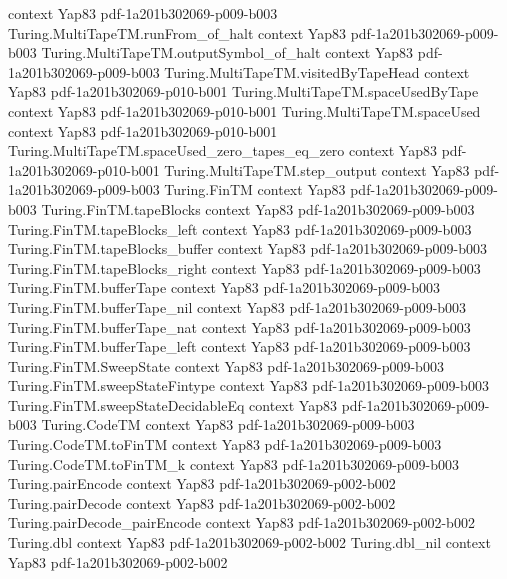 \begin{theorem}
  {context}
  {Yap83}
  {pdf-1a201b302069-p009-b003}
\proofstep
  {Turing.MultiTapeTM.runFrom_of_halt}
  {context}
  {Yap83}
  {pdf-1a201b302069-p009-b003}
\proofstep
  {Turing.MultiTapeTM.outputSymbol_of_halt}
  {context}
  {Yap83}
  {pdf-1a201b302069-p009-b003}
\proofstep
  {Turing.MultiTapeTM.visitedByTapeHead}
  {context}
  {Yap83}
  {pdf-1a201b302069-p010-b001}
\proofstep
  {Turing.MultiTapeTM.spaceUsedByTape}
  {context}
  {Yap83}
  {pdf-1a201b302069-p010-b001}
\proofstep
  {Turing.MultiTapeTM.spaceUsed}
  {context}
  {Yap83}
  {pdf-1a201b302069-p010-b001}
\proofstep
  {Turing.MultiTapeTM.spaceUsed_zero_tapes_eq_zero}
  {context}
  {Yap83}
  {pdf-1a201b302069-p010-b001}
\proofstep
  {Turing.MultiTapeTM.step_output}
  {context}
  {Yap83}
  {pdf-1a201b302069-p009-b003}
\proofstep
  {Turing.FinTM}
  {context}
  {Yap83}
  {pdf-1a201b302069-p009-b003}
\proofstep
  {Turing.FinTM.tapeBlocks}
  {context}
  {Yap83}
  {pdf-1a201b302069-p009-b003}
\proofstep
  {Turing.FinTM.tapeBlocks_left}
  {context}
  {Yap83}
  {pdf-1a201b302069-p009-b003}
\proofstep
  {Turing.FinTM.tapeBlocks_buffer}
  {context}
  {Yap83}
  {pdf-1a201b302069-p009-b003}
\proofstep
  {Turing.FinTM.tapeBlocks_right}
  {context}
  {Yap83}
  {pdf-1a201b302069-p009-b003}
\proofstep
  {Turing.FinTM.bufferTape}
  {context}
  {Yap83}
  {pdf-1a201b302069-p009-b003}
\proofstep
  {Turing.FinTM.bufferTape_nil}
  {context}
  {Yap83}
  {pdf-1a201b302069-p009-b003}
\proofstep
  {Turing.FinTM.bufferTape_nat}
  {context}
  {Yap83}
  {pdf-1a201b302069-p009-b003}
\proofstep
  {Turing.FinTM.bufferTape_left}
  {context}
  {Yap83}
  {pdf-1a201b302069-p009-b003}
\proofstep
  {Turing.FinTM.SweepState}
  {context}
  {Yap83}
  {pdf-1a201b302069-p009-b003}
\proofstep
  {Turing.FinTM.sweepStateFintype}
  {context}
  {Yap83}
  {pdf-1a201b302069-p009-b003}
\proofstep
  {Turing.FinTM.sweepStateDecidableEq}
  {context}
  {Yap83}
  {pdf-1a201b302069-p009-b003}
\proofstep
  {Turing.CodeTM}
  {context}
  {Yap83}
  {pdf-1a201b302069-p009-b003}
\proofstep
  {Turing.CodeTM.toFinTM}
  {context}
  {Yap83}
  {pdf-1a201b302069-p009-b003}
\proofstep
  {Turing.CodeTM.toFinTM_k}
  {context}
  {Yap83}
  {pdf-1a201b302069-p009-b003}
\proofstep
  {Turing.pairEncode}
  {context}
  {Yap83}
  {pdf-1a201b302069-p002-b002}
\proofstep
  {Turing.pairDecode}
  {context}
  {Yap83}
  {pdf-1a201b302069-p002-b002}
\proofstep
  {Turing.pairDecode_pairEncode}
  {context}
  {Yap83}
  {pdf-1a201b302069-p002-b002}
\proofstep
  {Turing.dbl}
  {context}
  {Yap83}
  {pdf-1a201b302069-p002-b002}
\proofstep
  {Turing.dbl_nil}
  {context}
  {Yap83}
  {pdf-1a201b302069-p002-b002}

\end{theorem}
